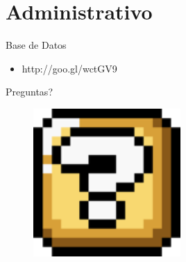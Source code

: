 \section{Administrativo}



\begin{frame}{Base de Datos}
	\begin{itemize}
		\item http://goo.gl/wctGV9
	\end{itemize}
\end{frame}
 
 \begin{frame}{Preguntas?}
	
 	\begin{figure}[H]
		\centering
		\includegraphics[width=0.5\textwidth]{imgs/preguntas}
	\end{figure}
	
\end{frame}
